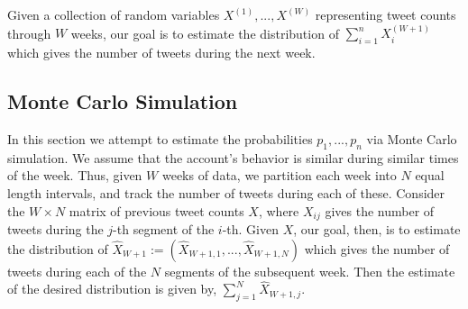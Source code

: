 \documentclass{article}
\begin{document}
Given a collection of random variables $X^{(1)},...,X^{(W)}$ representing tweet counts through $W$ weeks, our goal is to estimate
the distribution of $\sum_{i=1}^n X_i^{(W+1)}$ which gives the number of tweets during the next week.


\subsection{Monte Carlo Simulation}
In this section we attempt to estimate the probabilities $p_1,...,p_n$ via Monte Carlo simulation.
We assume that the account's behavior is similar during similar times of the week. Thus, given $W$ weeks of data,
we partition each week into $N$ equal length intervals,
and track the number of tweets during each of these.
Consider the $W \times N$ matrix of previous tweet counts
$X$, where $X_{ij}$ gives the number of tweets during the $j$-th segment of the $i$-th. Given $X$, our goal, then,
is to estimate the distribution of $\hat{X}_{W+1} :=  (\hat{X}_{W+1,1},...,\hat{X}_{W+1,N})$ which gives the number of tweets during each of the $N$ segments
of the subsequent week. Then the estimate of the desired distribution is given by, $\sum_{j=1}^N \hat{X}_{W+1, j}$. 

 

\end{document}
